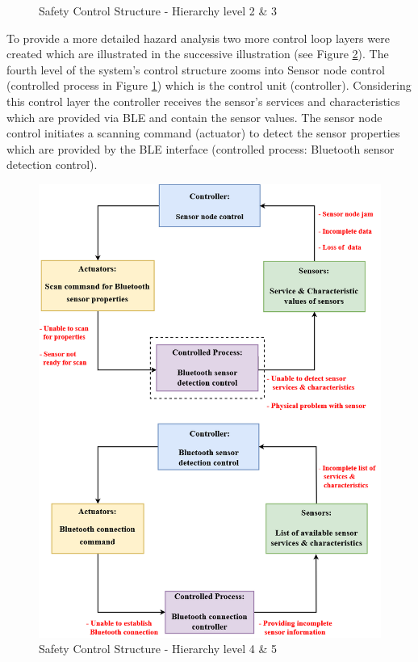 \documentclass[review]{elsarticle}
\begin{document}
\begin{itemize}
\begin{figure}[!ht]
		\caption[Safety Control Structure - Hierarchy level 2 \& 3]{Safety Control Structure - Hierarchy level 2 \& 3}
		\label{fig:STAMPLevel2+3}
	\end{figure} 
	\newpage
 	To provide a more detailed hazard analysis two more control loop layers were created which are illustrated in the successive illustration (see Figure  \ref{fig:STAMPLevel4+5}). The fourth level of the system's control structure zooms into Sensor node control (controlled process in Figure \ref{fig:STAMPLevel2+3}) which is the control unit (controller). Considering this control layer the controller receives the sensor's services and characteristics which are provided via BLE and contain the sensor values. The sensor node control initiates a scanning command (actuator) to detect the sensor properties which are provided by the BLE interface (controlled process: Bluetooth sensor detection control).  
	
	\begin{figure}[!ht]
		\centering
		\includegraphics[scale=0.34]{Images/STAMP4+5level(2)}
		\caption[Safety Control Structure - Hierarchy level 4 \& 5]{Safety Control Structure - Hierarchy level 4 \& 5}
		\label{fig:STAMPLevel4+5}
	\end{figure}
    \newpage
    

\end{itemize}
\end{document}
